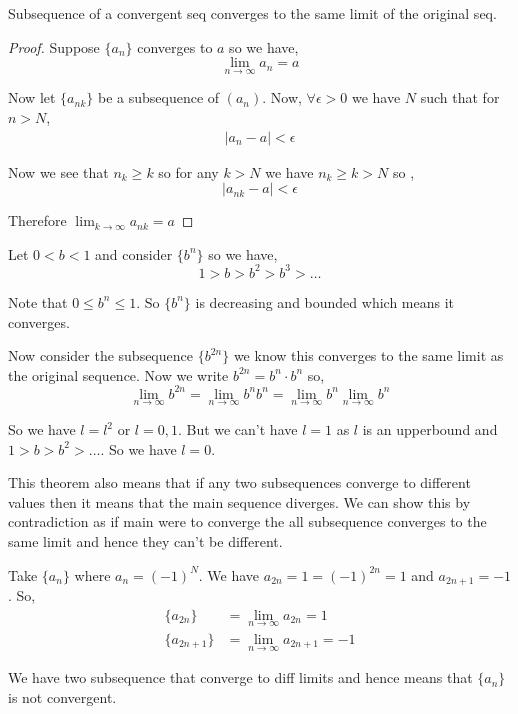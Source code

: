 \begin{theorem}
    Subsequence of a convergent seq converges to the same limit of the original seq.
\end{theorem}
\begin{proof}
    Suppose $\{a_n\} $ converges to $a$ so we have,  
    $$ \lim_{n \to \infty} a_n = a $$ 

    Now let $\{a_{nk}\} $ be a subsequence of $(a_n)$. Now, $\forall \epsilon > 0$ we have $N$ such that for $n > N$, 
    \begin{align*}
        |a_n - a| < \epsilon
    \end{align*}

    Now we see that $n_k \ge k$ so for any $k > N$ we have  $n_k \ge k > N$ so ,  
    $$ |a_{nk} - a| < \epsilon $$ 

    Therefore $\lim_{k \to \infty} a_{nk} = a$
\end{proof}
\begin{eg}
    Let $0 < b < 1$ and consider  $\{b^{n}\}$  so we have, 
    $$ 1 > b > b^{2} > b^3 > \dots $$ 

    Note that $0 \le b^{n} \le 1$. So $\{b^{n}\}$ is decreasing and bounded which means it converges.

    \vspace{1em}
    
    Now consider the subsequence $\{b^{2n}\}$  we know this converges to the same limit as the original sequence. Now we write $b^{2n} = b^{n} \cdot b^{n}$ so, 
    $$ \lim_{n \to \infty} b^{2n} = \lim_{n \to \infty} b^{n} b^{n}= \lim_{n \to \infty} b^{n} \lim_{n \to \infty} b^{n}$$

    So we have $l = l^2$ or $l = 0, 1$. But we can't have $l = 1$ as  $l$ is an upperbound and $1 > b > b^2 > \dots$. So we have $l = 0$.
\end{eg}


\begin{remark}
    This theorem also means that if any two subsequences converge to different values then it means that the main sequence diverges. We can show this by contradiction as if main were to converge the all subsequence converges to the same limit and hence they can't be different.
\end{remark}

\begin{eg}
    Take $\{a_n\} $ where $a_n = (-1)^{N}$. We have $a_{2n} = 1 = (-1)^{2n} = 1$ and $a_{2n + 1} = -1$. So,  
    \begin{align*}
        \{a_{2n}\} &= \lim_{n \to \infty} a_{2n} = 1\\
        \{a_{2n + 1}\} &= \lim_{n \to \infty} a_{2n + 1} = -1
    \end{align*}

    We have two subsequence that converge to diff limits and hence  means that $\{a_n\} $ is not convergent.
\end{eg}


